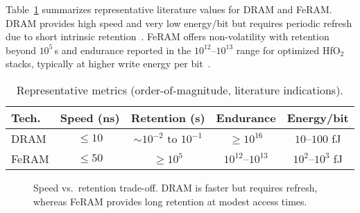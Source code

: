 \label{sec:comparison}

Table~\ref{tab:comparison} summarizes representative literature values for DRAM and FeRAM. 
DRAM provides high speed and very low energy/bit but requires periodic refresh due to short intrinsic retention~\cite{choi2022,kim2021_dram,iedm2023_dram}. 
FeRAM offers non-volatility with retention beyond $10^{5}$\,s and endurance reported in the $10^{12}$--$10^{13}$ range for optimized HfO$_2$ stacks, 
typically at higher write energy per bit~\cite{boscke2011,mueller2012,noheda2023,martin2020}.

\begin{table}[!t]
\centering
\caption{Representative metrics (order-of-magnitude, literature indications).}
\label{tab:comparison}
\scriptsize
\begin{tabular}{lcccc}
\toprule
Tech. & Speed (ns) & Retention (s) & Endurance & Energy/bit \\
\midrule
DRAM  & $\le 10$  & $\sim 10^{-2}$ to $10^{-1}$ & $\ge 10^{16}$ & $10$--$100$ fJ \\
FeRAM & $\le 50$  & $\ge 10^{5}$                & $10^{12}$--$10^{13}$ & $10^{2}$--$10^{3}$ fJ \\
\bottomrule
\end{tabular}
\end{table}

\begin{figure}[!t]
\centering
{}
\caption{Speed vs.\ retention trade-off. DRAM is faster but requires refresh, whereas FeRAM provides long retention at modest access times.}
\label{fig:speed_retention}
\end{figure}

